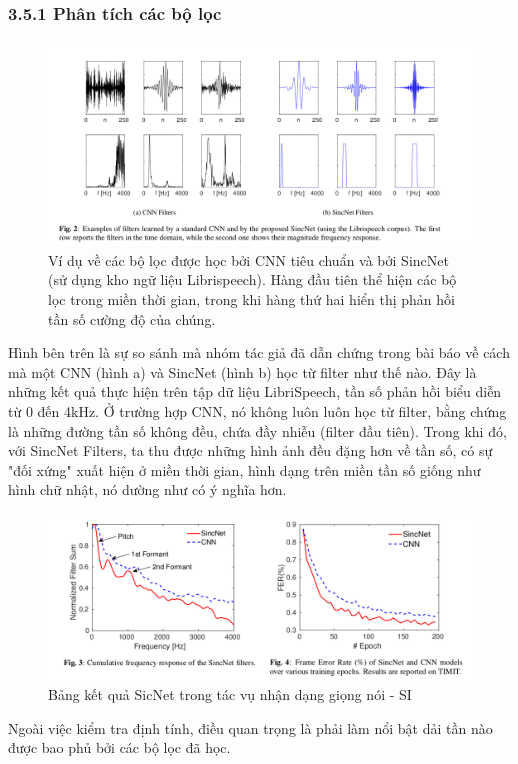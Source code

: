 \documentclass{article}
\begin{document}
	\subsubsection{3.5.1 Phân tích các bộ lọc}
	\begin{figure}[H]
		\centering
		\includegraphics[width=1\textwidth]{images/cnn_filters_sincnet_filters.png}
		\caption{Ví dụ về các bộ lọc được học bởi CNN tiêu chuẩn và bởi SincNet (sử dụng kho ngữ liệu Librispeech). Hàng đầu tiên thể hiện các bộ lọc trong miền thời gian, trong khi hàng thứ hai hiển thị phản hồi tần số cường độ của chúng.}
		\label{fig:writing-thesis}
	\end{figure}
	Hình bên trên là sự so sánh mà nhóm tác giả đã dẫn chứng trong bài báo về cách mà một CNN (hình a) và SincNet (hình b) học từ filter như thế nào. Đây là những kết quả thực hiện trên tập dữ liệu LibriSpeech, tần số phản hồi biểu diễn từ 0 đến 4kHz. Ở trường hợp CNN, nó không luôn luôn học từ filter, bằng chứng là những đường tần số không đều, chứa đầy nhiễu (filter đầu tiên). Trong khi đó, với SincNet Filters, ta thu được những hình ảnh đều đặng hơn về tần số, có sự "đối xứng" xuất hiện ở miền thời gian, hình dạng trên miền tần số giống như hình chữ nhật, nó dường như có ý nghĩa hơn.
	
	\begin{figure}[H]
		\centering
		\includegraphics[width=1\textwidth]{images/filter_analysis.png}
		\caption{Bảng kết quả SicNet trong tác vụ nhận dạng giọng nói - SI}
		\label{fig:writing-thesis}
	\end{figure}
	Ngoài việc kiểm tra định tính, điều quan trọng là phải làm nổi bật dải tần nào được bao phủ bởi các bộ lọc đã học. 
	
\end{document}
